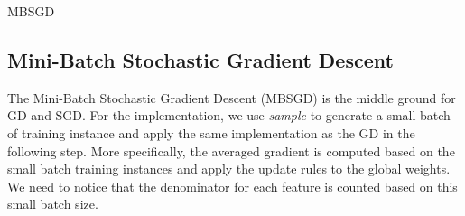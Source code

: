 \documentclass[sigconf]{acmart}
\makeatletter
\def\BState{\State\hskip-\ALG@thistlm}
\makeatother
\begin{document}
\begin{algorithm}
\caption{MBSGD}\label{MBSGD}
\end{algorithm}


\subsection{Mini-Batch Stochastic Gradient Descent}
\label{sec:implementationMBGD}

The Mini-Batch Stochastic Gradient Descent (MBSGD) is the middle ground for GD and SGD. For the implementation, we use \textit{sample} to generate a small batch of training instance and apply the same implementation as the GD in the following step. More specifically, the averaged gradient is computed based on the small batch training instances and apply the update rules to the global weights. We need to notice that the denominator for each feature is counted based on this small batch size. 
\end{document}
